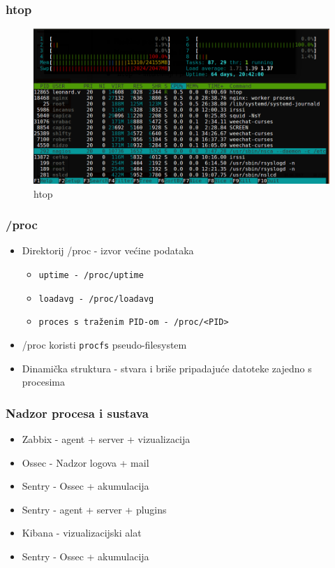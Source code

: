 \documentclass[t,table,usenames,dvipsnames]{beamer}
\newcommand{\shell}[1]{\texttt{#1}}
\begin{document}
\begin{frame}
    \frametitle{htop}
    \begin{figure}
        \centering
        \includegraphics[width=1.0\linewidth]{htop-marvin}
        \caption{htop}
        \label{fig:htop-marvin}
    \end{figure}
\end{frame}

\begin{frame}
    \frametitle{/proc}
    \begin{itemize}
        \item Direktorij /proc - izvor većine podataka
        \begin{itemize}
            \item \shell{uptime - /proc/uptime}
            \item \shell{loadavg - /proc/loadavg}
            \item \shell{proces s traženim PID-om - /proc/\textless PID\textgreater}
        \end{itemize}
        \item /proc koristi \shell{procfs} pseudo-filesystem
        \item Dinamička struktura - stvara i briše pripadajuće datoteke zajedno s procesima
    \end{itemize}
\end{frame}

\begin{frame}
	\frametitle{Nadzor procesa i sustava}
	
	\begin{itemize}
		\item Zabbix - agent + server + vizualizacija
        \item Ossec - Nadzor logova + mail
        \item Sentry - Ossec + akumulacija
		\item Sentry - agent + server + plugins
		\item Kibana - vizualizacijski alat
		\item Sentry - Ossec + akumulacija
	\end{itemize}
	
\end{frame}
\end{document}
